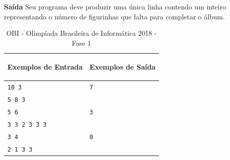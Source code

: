 \vspace{0.3cm}
\textbf{Saída}
Seu programa deve produzir uma única linha contendo um inteiro representando o número de figurinhas que falta para completar o álbum.
\begin{table}[h]
    \centering
    \begin{tabular}{|p{7cm}|p{7cm}|}
        \hline
         \begin{center}
            \vspace{-0.3cm}
             \textbf{Exemplos de Entrada}
            \vspace{-0.3cm}
         \end{center} 
         &  
         \begin{center}
            \vspace{-0.3cm}
             \textbf{Exemplos de Saída}
            \vspace{-0.3cm}
         \end{center} \\
        \hline
         \texttt{10 3} & \texttt{7} \\
         \texttt{5 8 3} & \\
        \hline
         \texttt{5 6} & \texttt{3} \\
         \texttt{3 3 2 3 3 3} & \\
         \hline         
          \texttt{3 4} & \texttt{0} \\
         \texttt{2 1 3 3} & \\
         \hline             
    \end{tabular}
    \caption{OBI - Olimpíada Brasileira de Informática 2018 - Fase 1}
    \label{tab:inputb}
    
\end{table}

\newpage

\begin{center}
\noindent

\end{center}